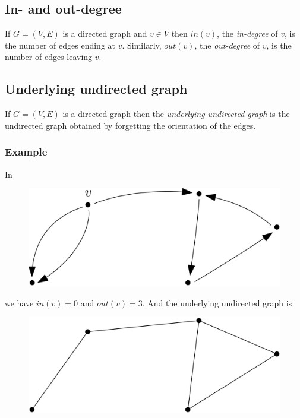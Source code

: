 \documentclass[11pt]{article}
\begin{document}
    \subsection{In- and out-degree}

    If \(G = (V,E)\) is a directed graph and \(v \in V\) then \(in(v)\), the \emph{in-degree} of $v$, is the number of edges ending at $v$. Similarly, \(out(v)\), the \emph{out-degree} of $v$, is the number of edges leaving $v$. 

    \subsection{Underlying undirected graph}

    If \(G = (V,E)\) is a directed graph then the \emph{underlying undirected graph} is the undirected graph obtained by forgetting the orientation of the edges. 

    \subsubsection{Example}

    In 
    \begin{figure}[H]
        \centering
        \includegraphics[scale=0.1]{inout.png}
    \end{figure}
    we have \(in(v) = 0\) and \(out(v) = 3\). And the underlying undirected graph is
    \begin{figure}[H]
        \centering
        \includegraphics[scale=0.1]{underlying.png}
    \end{figure}
\end{document}
